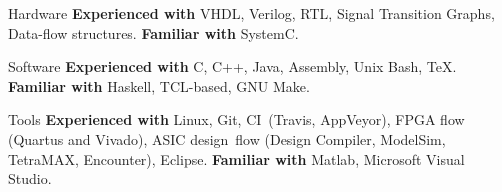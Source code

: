
\begin{cvskills}

\cvskill
{Hardware}
{\textbf{Experienced with} VHDL, Verilog, RTL, Signal Transition Graphs, 
Data-flow structures. \textbf{Familiar with} SystemC.}

\cvskill
{Software}
{\textbf{Experienced with} C, C++, Java, Assembly, Unix Bash, TeX. 
\textbf{Familiar with} Haskell, TCL-based, GNU Make.}

\cvskill
{Tools}
{\textbf{Experienced with} Linux, Git, CI~(Travis, AppVeyor), FPGA 
flow (Quartus and Vivado), ASIC design~flow (Design Compiler, ModelSim, 
TetraMAX, Encounter), Eclipse. \textbf{Familiar with} Matlab, 
Microsoft Visual 
Studio.}

\end{cvskills}

